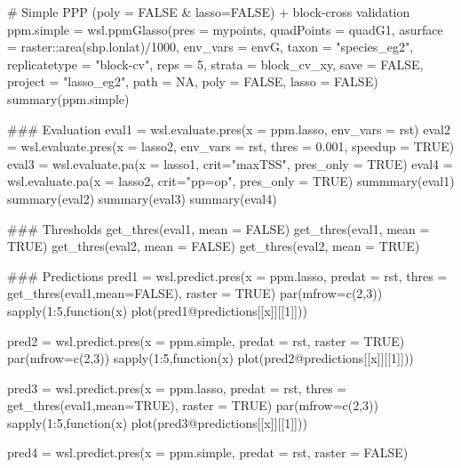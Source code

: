 \documentclass[a4paper]{book}
\begin{document}
\begin{Examples}
\begin{ExampleCode}
  # Simple PPP (poly = FALSE & lasso=FALSE) + block-cross validation
ppm.simple = wsl.ppmGlasso(pres = mypoints,
                       quadPoints = quadG1,
                       asurface = raster::area(shp.lonlat)/1000,
                       env_vars = envG,
                       taxon = "species_eg2",
                       replicatetype = "block-cv",
                       reps = 5,
                       strata = block_cv_xy,
                       save = FALSE,
                       project = "lasso_eg2",
                       path = NA,
                       poly = FALSE,
                       lasso = FALSE)
summary(ppm.simple)

### Evaluation
eval1 = wsl.evaluate.pres(x = ppm.lasso,
                          env_vars = rst)
eval2 = wsl.evaluate.pres(x = lasso2,
                          env_vars = rst,
                          thres = 0.001,
                          speedup = TRUE)
eval3 = wsl.evaluate.pa(x = lasso1,
                        crit="maxTSS",
                        pres_only = TRUE)
eval4 = wsl.evaluate.pa(x = lasso2,
                        crit="pp=op",
                        pres_only = TRUE)
summmary(eval1)
summary(eval2)
summary(eval3)
summary(eval4)

### Thresholds
get_thres(eval1, mean = FALSE)
get_thres(eval1, mean = TRUE)
get_thres(eval2, mean = FALSE)
get_thres(eval2, mean = TRUE)

### Predictions
pred1 = wsl.predict.pres(x = ppm.lasso,
                         predat = rst,
                         thres = get_thres(eval1,mean=FALSE),
                         raster = TRUE)
par(mfrow=c(2,3))
sapply(1:5,function(x) plot(pred1@predictions[[x]][[1]]))

pred2 = wsl.predict.pres(x = ppm.simple,
                         predat = rst,
                         raster = TRUE)
par(mfrow=c(2,3))
sapply(1:5,function(x) plot(pred2@predictions[[x]][[1]]))

pred3 = wsl.predict.pres(x = ppm.lasso,
                         predat = rst,
                         thres = get_thres(eval1,mean=TRUE),
                         raster = TRUE)
par(mfrow=c(2,3))
sapply(1:5,function(x) plot(pred3@predictions[[x]][[1]]))

pred4 = wsl.predict.pres(x = ppm.simple,
                         predat = rst,
                         raster = FALSE)

\end{ExampleCode}
\end{Examples}
\end{document}
